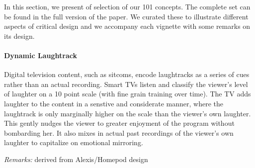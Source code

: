 In this section, we present of selection of our 101 concepts. The complete set can be found in the full version of the paper. We curated these to illustrate different aspects of critical design and we accompany each vignette with some remarks on its design.



\paragraph{Dynamic Laughtrack}

Digital television content, such as sitcoms, encode laughtracks as a series of cues rather than an actual recording. Smart TVs listen and classify the viewer's level of laughter on a 10 point scale (with fine grain training over time). The TV adds laughter to the content in a senstive and considerate manner, where the laughtrack is only marginally higher on the scale than the viewer's own laughter. This gently nudges the viewer to greater enjoyment of the program without bombarding her. It also mixes in actual past recordings of the viewer's own laughter to capitalize on emotional mirroring.

\textit{Remarks:} derived from Alexis/Homepod design


